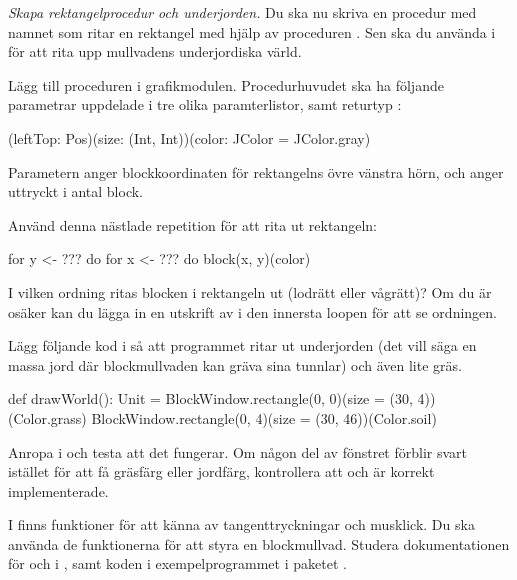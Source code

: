 \Task \emph{Skapa rektangelprocedur och underjorden.} Du ska nu skriva en procedur med namnet  som ritar en rektangel med hjälp av proceduren . Sen ska du använda  i  för att rita upp mullvadens underjordiska värld.

\Subtask
Lägg till proceduren  i grafikmodulen. Procedurhuvudet ska ha följande parametrar uppdelade i tre olika paramterlistor, samt returtyp :
\begin{Code}
(leftTop: Pos)(size: (Int, Int))(color: JColor = JColor.gray)
\end{Code}

Parametern  anger blockkoordinaten för rektangelns övre vänstra hörn, och  anger  uttryckt i antal block.

Använd denna nästlade repetition för att rita ut rektangeln:

\begin{Code}
for y <- ??? do
	for x <- ??? do
		block(x, y)(color)
\end{Code}

\Subtask\Pen
I vilken ordning ritas blocken i rektangeln ut (lodrätt eller vågrätt)? Om du är osäker kan du lägga in en utskrift av  i den innersta loopen för att se ordningen.

\Subtask Lägg följande kod i  så att programmet ritar ut underjorden (det vill säga en massa jord där blockmullvaden kan gräva sina tunnlar) och även lite gräs.

\begin{Code}
def drawWorld(): Unit = 
  BlockWindow.rectangle(0, 0)(size = (30, 4))(Color.grass)
  BlockWindow.rectangle(0, 4)(size = (30, 46))(Color.soil)
\end{Code}

\Subtask Anropa  i  och testa att det fungerar. Om någon del av fönstret förblir svart istället för att få gräsfärg eller jordfärg, kontrollera att  och  är korrekt implementerade.

\Task
I  finns funktioner för att känna av tangenttryckningar och mus\-klick.
Du ska använda de funktionerna för att styra en blockmullvad. Studera dokumentationen för  och  i , samt koden i exempelprogrammet  i paketet .

